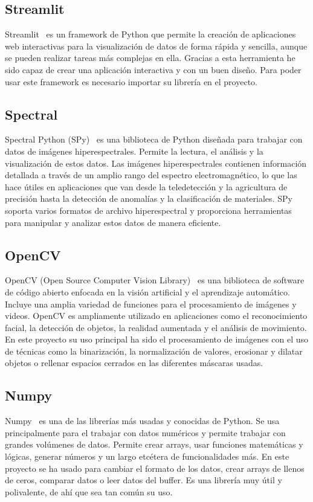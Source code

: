 \subsection{Streamlit}
Streamlit~\cite{streamlit} es un framework de Python que permite la creación de aplicaciones web interactivas para la visualización de datos de forma rápida y sencilla, aunque se pueden realizar tareas más complejas en ella. Gracias a esta herramienta he sido capaz de crear una aplicación interactiva y con un buen diseño. Para poder usar este framework es necesario importar su librería en el proyecto.

\subsection{Spectral}
Spectral Python (SPy)~\cite{spectral} es una biblioteca de Python diseñada para trabajar con datos de imágenes hiperespectrales. Permite la lectura, el análisis y la visualización de estos datos. Las imágenes hiperespectrales contienen información detallada a través de un amplio rango del espectro electromagnético, lo que las hace útiles en aplicaciones que van desde la teledetección y la agricultura de precisión hasta la detección de anomalías y la clasificación de materiales. SPy soporta varios formatos de archivo hiperespectral y proporciona herramientas para manipular y analizar estos datos de manera eficiente.

\subsection{OpenCV}
OpenCV (Open Source Computer Vision Library)~\cite{openCV} es una biblioteca de software de código abierto enfocada en la visión artificial y el aprendizaje automático. Incluye una amplia variedad de funciones para el procesamiento de imágenes y videos. OpenCV es ampliamente utilizado en aplicaciones como el reconocimiento facial, la detección de objetos, la realidad aumentada y el análisis de movimiento. En este proyecto su uso principal ha sido el procesamiento de imágenes con el uso de técnicas como la binarización, la normalización de valores, erosionar y dilatar objetos o rellenar espacios cerrados en las diferentes máscaras usadas.

\subsection{Numpy}
Numpy~\cite{numpy} es una de las librerías más usadas y conocidas de Python. Se usa principalmente para el trabajar con datos numéricos y permite trabajar con grandes volúmenes de datos. Permite crear arrays, usar funciones matemáticas y lógicas, generar números y un largo etcétera de funcionalidades más. En este proyecto se ha usado para cambiar el formato de los datos, crear arrays de llenos de ceros, comparar datos o leer datos del buffer. Es una librería muy útil y polivalente, de ahí que sea tan común su uso.


